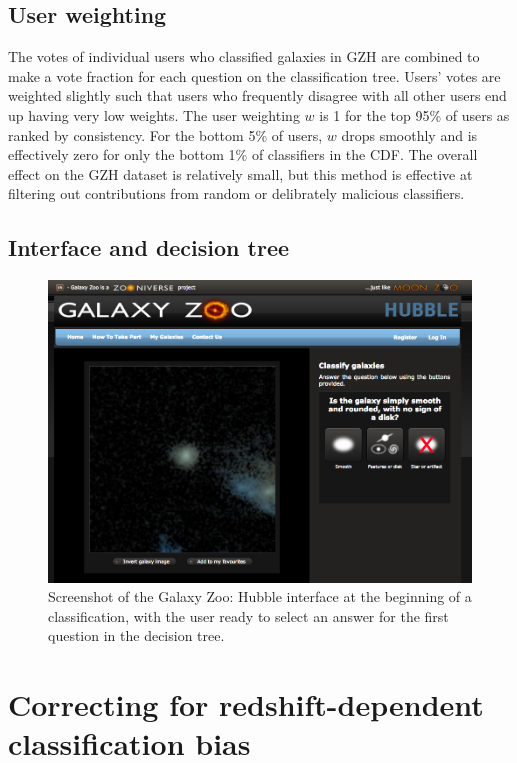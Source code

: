 \documentclass[twocolumn]{aastex6}
\begin{document}
\subsection{User weighting}\label{ssec:weighting}
The votes of individual users who classified galaxies in GZH are combined to make a vote fraction for each question on the classification tree. Users' votes are weighted slightly \citep[in a method identical to that described in][]{wil13} such that users who frequently disagree with all other users end up having very low weights. The user weighting $w$ is 1 for the top 95\% of users as ranked by consistency. For the bottom 5\% of users, $w$ drops smoothly and is effectively zero for only the bottom 1\% of classifiers in the CDF. The overall effect on the GZH dataset is relatively small, but this method is effective at filtering out contributions from random or delibrately malicious classifiers.

\subsection{Interface and decision tree}\label{ssec:interface}

\begin{figure}
\center
\includegraphics[width=160mm]{figures/gzh_interface.png}
\caption{Screenshot of the Galaxy Zoo: Hubble interface at the beginning of a classification, with the user ready to select an answer for the first question in the decision tree.\label{fig:interface}}
\end{figure}


\section{Correcting for redshift-dependent classification bias}\label{sec:debiasing}
\end{document}
